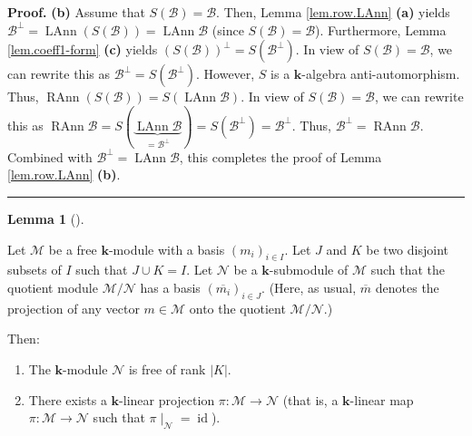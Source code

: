 \documentclass[numbers=enddot,12pt,final,onecolumn,notitlepage]{scrartcl}%
\numberwithin{exer}{subsection}
\theoremstyle{definition}
\newtheorem{lem}[theo]{Lemma}
\newenvironment{lemma}[1][]
{\begin{lem}[#1]\begin{leftbar}}
{\end{leftbar}\end{lem}}
\newenvironment{proof}[1][Proof]{\noindent\textbf{#1.} }{\ \rule{0.5em}{0.5em}}
\begin{document}
\begin{proof}
\textbf{(b)} Assume that $S\left(  \mathcal{B}\right)  =\mathcal{B}$. Then,
Lemma \ref{lem.row.LAnn} \textbf{(a)} yields $\mathcal{B}^{\perp
}=\operatorname*{LAnn}\left(  S\left(  \mathcal{B}\right)  \right)
=\operatorname*{LAnn}\mathcal{B}$ (since $S\left(  \mathcal{B}\right)
=\mathcal{B}$). Furthermore, Lemma \ref{lem.coeff1-form} \textbf{(c)} yields
$\left(  S\left(  \mathcal{B}\right)  \right)  ^{\perp}=S\left(
\mathcal{B}^{\perp}\right)  $. In view of $S\left(  \mathcal{B}\right)
=\mathcal{B}$, we can rewrite this as $\mathcal{B}^{\perp}=S\left(
\mathcal{B}^{\perp}\right)  $. However, $S$ is a $\mathbf{k}$-algebra
anti-automorphism. Thus, $\operatorname*{RAnn}\left(  S\left(  \mathcal{B}%
\right)  \right)  =S\left(  \operatorname*{LAnn}\mathcal{B}\right)  $. In view
of $S\left(  \mathcal{B}\right)  =\mathcal{B}$, we can rewrite this as
$\operatorname*{RAnn}\mathcal{B}=S\left(  \underbrace{\operatorname*{LAnn}%
\mathcal{B}}_{=\mathcal{B}^{\perp}}\right)  =S\left(  \mathcal{B}^{\perp
}\right)  =\mathcal{B}^{\perp}$. Thus, $\mathcal{B}^{\perp}%
=\operatorname*{RAnn}\mathcal{B}$. Combined with $\mathcal{B}^{\perp
}=\operatorname*{LAnn}\mathcal{B}$, this completes the proof of Lemma
\ref{lem.row.LAnn} \textbf{(b)}.
\end{proof}

\begin{lemma}
\label{lem.mod.sub-basis}Let $\mathcal{M}$ be a free $\mathbf{k}$-module with
a basis $\left(  m_{i}\right)  _{i\in I}$. Let $J$ and $K$ be two disjoint
subsets of $I$ such that $J\cup K=I$. Let $\mathcal{N}$ be a $\mathbf{k}%
$-submodule of $\mathcal{M}$ such that the quotient module $\mathcal{M}%
/\mathcal{N}$ has a basis $\left(  \overline{m_{i}}\right)  _{i\in J}$. (Here,
as usual, $\overline{m}$ denotes the projection of any vector $m\in
\mathcal{M}$ onto the quotient $\mathcal{M}/\mathcal{N}$.)

Then:

\begin{enumerate}
\item[\textbf{(a)}] The $\mathbf{k}$-module $\mathcal{N}$ is free of rank
$\left\vert K\right\vert $.

\item[\textbf{(b)}] There exists a $\mathbf{k}$-linear projection
$\pi:\mathcal{M}\rightarrow\mathcal{N}$ (that is, a $\mathbf{k}$-linear map
$\pi:\mathcal{M}\rightarrow\mathcal{N}$ such that $\left.  \pi\mid
_{\mathcal{N}}\right.  =\operatorname*{id}$).
\end{enumerate}
\end{lemma}
\end{document}
